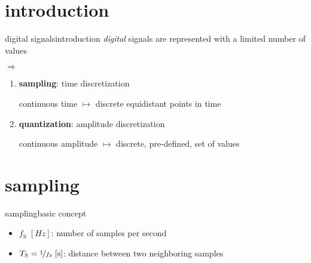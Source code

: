     \section[intro]{introduction}
        \begin{frame}{digital signals}{introduction}
            \textit{digital} signals are represented with a limited number of values
            
            \bigskip
            $\Rightarrow$
            \begin{enumerate}
                \item	{\color{gtgold}\textbf{sampling}}: time discretization
                
                continuous time $\mapsto$ discrete equidistant points in time 
                
                
                \smallskip
                \item	\textbf{quantization}: amplitude discretization
                
                continuous amplitude $\mapsto$ discrete, pre-defined, set of values
            \end{enumerate}
        \end{frame}
        
    \section{sampling}
        \begin{frame}{sampling}{basic concept}
                
            \begin{itemize}
                \item   $f_\mathrm{S}\;[\unit{Hz}]$: number of samples per second
                \item   $T_\mathrm{S} = \nicefrac{1}{f_\mathrm{S}}\;[\unit{s}]$: distance between two neighboring samples
            \end{itemize}
        \end{frame}
            

